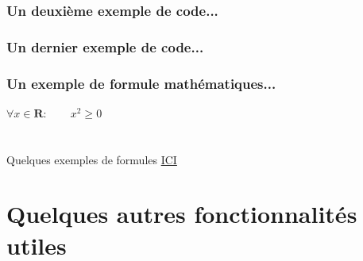 \documentclass{beamer}
\begin{document}
\begin{frame}[fragile]
  \frametitle{Un deuxième exemple de code...}
    \begin{small}
      
    \end{small}
\end{frame}

\begin{frame}[fragile]
  \frametitle{Un dernier exemple de code...}
    
\end{frame}


\begin{frame}
  \frametitle{Un exemple de formule mathématiques...}
  $\forall x \in \mathbf{R}: \qquad x^{2} \geq 0$
  \ \\ \ \\ \ \\ %
  Quelques exemples de formules \href{https://www.math-linux.com/latex-4/faq/latex-faq/article/latex-derivee-limite-somme-produit-et-integrale}{ICI}
\end{frame}

\section{Quelques autres fonctionnalités utiles}
\end{document}
